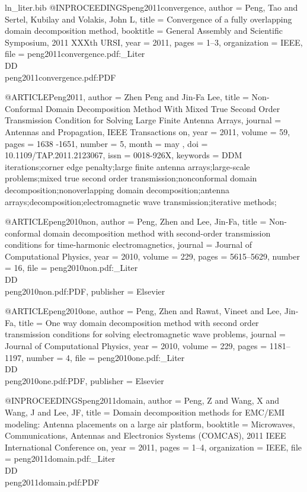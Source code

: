 \begin{filecontents*}{ln_liter.bib}
@INPROCEEDINGS{peng2011convergence,
  author = {Peng, Tao and Sertel, Kubilay and Volakis, John L},
  title = {Convergence of a fully overlapping domain decomposition method},
  booktitle = {General Assembly and Scientific Symposium, 2011 XXXth URSI},
  year = {2011},
  pages = {1--3},
  organization = {IEEE},
  file = {peng2011convergence.pdf:_Liter\\DD\\peng2011convergence.pdf:PDF}
}

@ARTICLE{Peng2011,
  author = {Zhen Peng and Jin-Fa Lee},
  title = {Non-Conformal Domain Decomposition Method With Mixed True Second
	Order Transmission Condition for Solving Large Finite Antenna Arrays},
  journal = {Antennas and Propagation, IEEE Transactions on},
  year = {2011},
  volume = {59},
  pages = {1638 -1651},
  number = {5},
  month = {may },
  doi = {10.1109/TAP.2011.2123067},
  issn = {0018-926X},
  keywords = {DDM iterations;corner edge penalty;large finite antenna arrays;large-scale
	problems;mixed true second order transmission;nonconformal domain
	decomposition;nonoverlapping domain decomposition;antenna arrays;decomposition;electromagnetic
	wave transmission;iterative methods;}
}

@ARTICLE{peng2010non,
  author = {Peng, Zhen and Lee, Jin-Fa},
  title = {Non-conformal domain decomposition method with second-order transmission
	conditions for time-harmonic electromagnetics},
  journal = {Journal of Computational Physics},
  year = {2010},
  volume = {229},
  pages = {5615--5629},
  number = {16},
  file = {peng2010non.pdf:_Liter\\DD\\peng2010non.pdf:PDF},
  publisher = {Elsevier}
}

@ARTICLE{peng2010one,
  author = {Peng, Zhen and Rawat, Vineet and Lee, Jin-Fa},
  title = {One way domain decomposition method with second order transmission
	conditions for solving electromagnetic wave problems},
  journal = {Journal of Computational Physics},
  year = {2010},
  volume = {229},
  pages = {1181--1197},
  number = {4},
  file = {peng2010one.pdf:_Liter\\DD\\peng2010one.pdf:PDF},
  publisher = {Elsevier}
}

@INPROCEEDINGS{peng2011domain,
  author = {Peng, Z and Wang, X and Wang, J and Lee, JF},
  title = {Domain decomposition methods for EMC/EMI modeling: Antenna placements
	on a large air platform},
  booktitle = {Microwaves, Communications, Antennas and Electronics Systems (COMCAS),
	2011 IEEE International Conference on},
  year = {2011},
  pages = {1--4},
  organization = {IEEE},
  file = {peng2011domain.pdf:_Liter\\DD\\peng2011domain.pdf:PDF}
}


\end{filecontents*}

